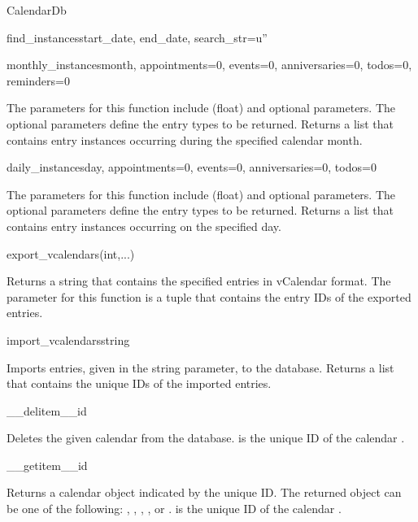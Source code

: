 \begin{classdesc*}{CalendarDb}
\begin{methoddesc}[CalendarDb]{find_instances}{start_date, end_date, search_str=u''}
\end{methoddesc}

\begin{methoddesc}[CalendarDb]{monthly_instances}{month, appointments=0, events=0, anniversaries=0, todos=0, reminders=0}

The parameters for this function include  (float) and 
optional parameters. The optional parameters define the entry types to be 
returned. Returns a list that contains entry instances occurring during the 
specified calendar month.

\end{methoddesc}

\begin{methoddesc}[CalendarDb]{daily_instances}{day, appointments=0, events=0, anniversaries=0, todos=0}

The parameters for this function include  (float) and 
optional parameters. The optional parameters define the entry types to be 
returned. Returns a list that contains entry instances occurring on the 
specified day.

\end{methoddesc}

\begin{methoddesc}[CalendarDb]{export_vcalendars}{(int,...)}

Returns a  string that contains the specified entries in 
vCalendar format. The parameter for this function is a tuple that contains 
the entry IDs of the exported entries.

\end{methoddesc}

\begin{methoddesc}[CalendarDb]{import_vcalendars}{string}

Imports  entries, given in the string parameter, to the 
database. Returns a list that contains the unique IDs of the imported 
entries.

\end{methoddesc}

\begin{methoddesc}[CalendarDb]{__delitem__}{id}

Deletes the given calendar  from the database.  is the 
unique ID of the calendar .

\end{methoddesc}

\begin{methoddesc}[CalendarDb]{__getitem__}{id}

Returns a calendar  object indicated by the unique ID. The returned 
object can be one of the following: , 
, , , 
or .  is the unique ID of the calendar . 

\end{methoddesc}

\end{classdesc*}

